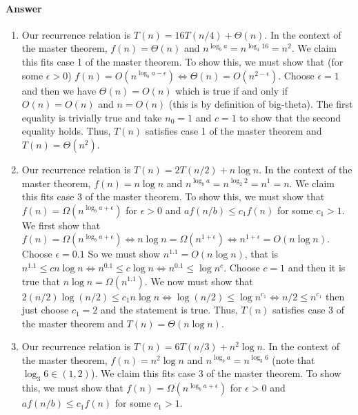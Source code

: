 \documentclass{article}
\begin{document}
\paragraph{Answer}


\begin{enumerate}
    \item Our recurrence relation is $T(n) = 16T(n/4) + \Theta (n)$.
    In the context of the master theorem, $f(n) = \Theta (n)$ and $n^{\log_b a} = n^{\log_4 16} = n^2$.
    We claim this fits case 1 of the master theorem.
    To show this, we must show that (for some $\epsilon > 0$) $f(n) = O(n^{\log_b a - \epsilon}) \iff \Theta (n) = O(n^{2 - \epsilon})$. \parspace
    Choose $\epsilon = 1$ and then we have $\Theta (n) = O(n)$ which is true if and only if $O(n) = O(n)$ and $n = O(n)$ (this is by definition of big-theta).
    The first equality is trivially true and take $n_0 = 1$ and $c = 1$ to show that the second equality holds. \parspace
    Thus, $T(n)$ satisfies case 1 of the master theorem and $T(n) = \Theta (n^2)$.
    \item Our recurrence relation is $T(n) = 2T(n/2) + n \log n$.
    In the context of the master theorem, $f(n) = n \log n$ and $n^{\log_b a} = n^{\log_2 2} = n^1 = n$.
    We claim this fits case 3 of the master theorem.
    To show this, we must show that $f(n) = \Omega (n^{\log_b a + \epsilon})$ for $\epsilon > 0$ and $a f(n/b) \leq c_1 f(n)$ for some $c_1 > 1$. \parspace
    We first show that $f(n) = \Omega (n^{\log_b a + \epsilon}) \iff n \log n = \Omega (n^{1 + \epsilon}) \iff n^{1 + \epsilon} = O(n \log n)$.
    Choose $\epsilon = 0.1$
    So we must show $n^{1.1} = O(n \log n)$, that is $n^{1.1} \leq c n \log n \iff n^{0.1} \leq c \log n \iff n^{0.1} \leq \log n^c$.
    Choose $c=1$ and then it is true that $n \log n = \Omega (n^{1.1})$. \parspace
    We now must show that $2 (n/2) \log (n/2) \leq c_1 n \log n \iff \log (n/2) \leq \log n^{c_1} \iff n/2 \leq n^{c_1} $ then just choose $c_1 = 2$ and the statement is true. \parspace
    Thus, $T(n)$ satisfies case 3 of the master theorem and $T(n) = \Theta (n \log n)$.
    \item Our recurrence relation is $T(n) = 6T(n/3) + n^2 \log n$.
    In the context of the master theorem, $f(n) = n^2 \log n$ and $n^{\log_b a} = n^{\log_3 6}$ (note that $\log_3 6 \in (1,2)$).
    We claim this fits case 3 of the master theorem.
    To show this, we must show that $f(n) = \Omega (n^{\log_b a + \epsilon})$ for $\epsilon > 0$ and $a f(n/b) \leq c_1 f(n)$ for some $c_1 > 1$. \parspace

\end{enumerate}
\end{document}

